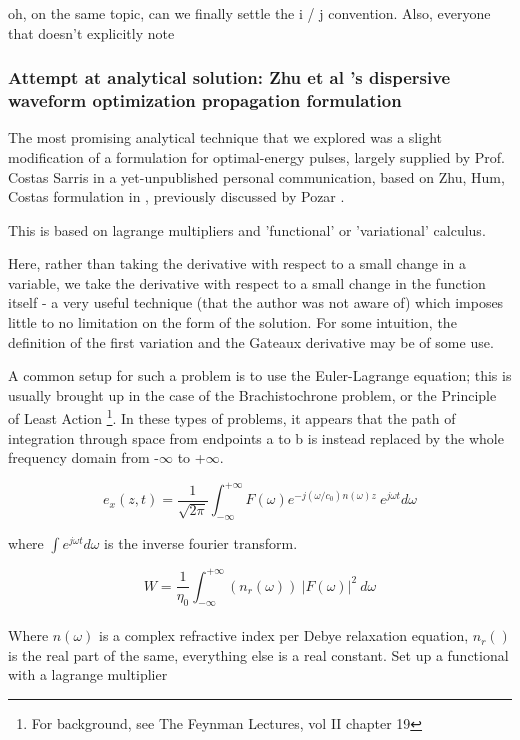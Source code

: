 \documentclass[paper.tex]{subfiles}
\begin{document}
oh, on the same topic, can we finally settle the i / j convention. Also, everyone that doesn't explicitly note  


\subsubsection{Attempt at analytical solution: Zhu et al 's dispersive waveform optimization propagation formulation}

The most promising analytical technique that we explored was a slight modification of a formulation for optimal-energy pulses, largely supplied by Prof. Costas Sarris in a yet-unpublished personal communication, based on Zhu, Hum, Costas formulation in \cite{Microwave2012b}, previously discussed by Pozar \cite{Waveform2003}. 

This is based on lagrange multipliers and 'functional' or 'variational' calculus\cite{Methods1989}. 

Here, rather than taking the derivative with respect to a small change in a variable, we take the derivative with respect to a small change in the function itself - a very useful technique (that the author was not aware of) which imposes little to no limitation on the form of the solution. For some intuition, the definition of the first variation and the Gateaux derivative may be of some use.

A common setup for such a problem is to use the Euler-Lagrange equation; this is usually brought up in the case of the Brachistochrone problem, or the Principle of Least Action \footnote{For background, see The Feynman Lectures, vol II chapter 19}. In these types of problems, it appears that the path of integration through space from endpoints a to b is instead replaced by the whole frequency domain from -$\infty$ to +$\infty$. 

$$ e_x(z,t) = \frac{1}{\sqrt{2 \pi}} \int_{-\infty}^{+\infty}{F(\omega) e^{- j (\omega/c_0)n(\omega)z}\ e^{j\omega t} d\omega} $$

where $\int e^{j \omega t} d\omega$ is the inverse fourier transform.

$$W = \frac{1}{\eta_0} \int_{-\infty}^{+\infty}{(n_r(\omega))\ |F(\omega)|^2}\ d\omega$$\\

Where $n(\omega)$ is a complex refractive index per Debye relaxation equation, $n_r()$ is the real part of the same, everything else is a real constant. Set up a functional with a lagrange multiplier\\
\end{document}
